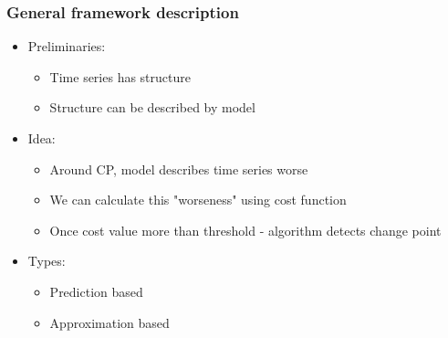 \documentclass[intlimits, 9pt, unicode]{beamer}
\begin{document}
%



\begin{frame}
    \frametitle{General framework description}

	    \begin{itemize}
		\item Preliminaries:
		\begin{itemize}
			\item Time series has structure
			\item Structure can be described by model
		\end{itemize}
		\item Idea:
		\begin{itemize}
			\item Around CP, model describes time series worse
			\item We can calculate this "worseness" using cost function
			\item Once cost value more than threshold - algorithm detects change point
		\end{itemize}
		\item Types:
		\begin{itemize}
			\item Prediction based
			\item Approximation based
		\end{itemize}
	    \end{itemize}

\end{frame}
\end{document}
